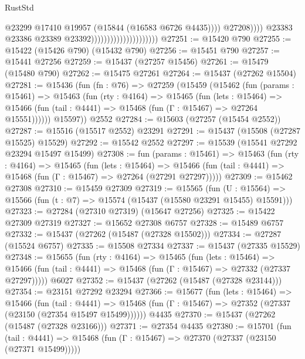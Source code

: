 \begin{lexlean}{RustStd}
\begin{coremodule}
                                                          @23299
                                                          @17410
                                                          @19957
                                                          (@15844 (@16583 @6726 @4435))))
                                                      @27208))))
                                              @23383
                                              @23386
                                              @23389
                                              @23392)))))))))))))))))))))
@27251 := @15420 @790
@27255 := @15422 (@15426 @790) (@15432 @790)
@27256 := @15451 @790
@27257 := @15441 @27256
@27259 := @15437 (@27257 @15456)
@27261 := @15479 (@15480 @790)
@27262 := @15475 @27261
@27264 := @15437 (@27262 @15504)
@27281 := @15436
    (fun (fn : @76) =>
    @27259
      (@15459
        (@15462
          (fun (params : @15461) =>
          @15463
            (fun (rty : @4164) =>
            @15465
              (fun (lets : @15464) =>
              @15466 (fun (tail : @4441) => @15468 (fun (Γ : @15467) => @27264 @15551))))))
        @15597))
    @2552
@27284 := @15603 (@27257 (@15454 @2552))
@27287 := @15516 (@15517 @2552) @23291
@27291 := @15437 (@15508 (@27287 @15525) @15529)
@27292 := @15542 @2552
@27297 := @15539 (@15541 @27292 @23294 @15497 @15499)
@27308 := fun (params : @15461) =>
  @15463
    (fun (rty : @4164) =>
    @15465
      (fun (lets : @15464) =>
      @15466 (fun (tail : @4441) => @15468 (fun (Γ : @15467) => @27264 (@27291 @27297)))))
@27309 := @15462 @27308
@27310 := @15459 @27309
@27319 := @15565
    (fun (U : @15564) => @15566 (fun (t : @7) => @15574 (@15437 (@15580 @23291 @15455) @15591)))
@27323 := @27284 (@27310 @27319) (@15647 @27256)
@27325 := @15422 @27309 @27319
@27327 := @15652 @27308 @6757
@27328 := @15489 @6757
@27332 := @15437 (@27262 (@15487 (@27328 @15502)))
@27334 := @27287 (@15524 @6757)
@27335 := @15508 @27334
@27337 := @15437 (@27335 @15529)
@27348 := @15655
    (fun (rty : @4164) =>
    @15465
      (fun (lets : @15464) =>
      @15466 (fun (tail : @4441) => @15468 (fun (Γ : @15467) => @27332 (@27337 @27297)))))
    @6027
@27352 := @15437 (@27262 (@15487 (@27328 @23144)))
@27354 := @23151 @27292 @23294
@27366 := @15677
    (fun (lets : @15464) =>
    @15466
      (fun (tail : @4441) =>
      @15468 (fun (Γ : @15467) => @27352 (@27337 (@23150 (@27354 @15497 @15499))))))
    @4435
@27370 := @15437 (@27262 (@15487 (@27328 @23166)))
@27371 := @27354 @4435
@27380 := @15701
    (fun (tail : @4441) => @15468 (fun (Γ : @15467) => @27370 (@27337 (@23150 (@27371 @15499)))))

\end{coremodule}
\end{lexlean}
